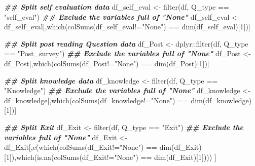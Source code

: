 \documentclass[
]{article}
\newenvironment{Shaded}{\begin{snugshade}}{\end{snugshade}}
\newcommand{\DecValTok}[1]{\textcolor[rgb]{0.00,0.00,0.81}{#1}}
\newcommand{\DocumentationTok}[1]{\textcolor[rgb]{0.56,0.35,0.01}{\textbf{\textit{#1}}}}
\newcommand{\FunctionTok}[1]{\textcolor[rgb]{0.00,0.00,0.00}{#1}}
\newcommand{\NormalTok}[1]{#1}
\newcommand{\OtherTok}[1]{\textcolor[rgb]{0.56,0.35,0.01}{#1}}
\newcommand{\SpecialCharTok}[1]{\textcolor[rgb]{0.00,0.00,0.00}{#1}}
\newcommand{\StringTok}[1]{\textcolor[rgb]{0.31,0.60,0.02}{#1}}
\begin{document}
\begin{Shaded}
\begin{Highlighting}[]
\DocumentationTok{\#\# Split self evaluation data}
\NormalTok{df\_self\_eval }\OtherTok{\textless{}{-}} \FunctionTok{filter}\NormalTok{(df, Q\_type }\SpecialCharTok{==} \StringTok{"self\_eval"}\NormalTok{)}
\DocumentationTok{\#\# Exclude the variables full of "None"}
\NormalTok{df\_self\_eval }\OtherTok{\textless{}{-}}\NormalTok{ df\_self\_eval[,}\FunctionTok{which}\NormalTok{(}\FunctionTok{colSums}\NormalTok{(df\_self\_eval}\SpecialCharTok{!=}\StringTok{"None"}\NormalTok{) }\SpecialCharTok{==} \FunctionTok{dim}\NormalTok{(df\_self\_eval)[}\DecValTok{1}\NormalTok{])]}

\DocumentationTok{\#\# Split post reading Question data}
\NormalTok{df\_Post }\OtherTok{\textless{}{-}}\NormalTok{ dplyr}\SpecialCharTok{::}\FunctionTok{filter}\NormalTok{(df, Q\_type }\SpecialCharTok{==} \StringTok{"Post\_survey"}\NormalTok{)}
\DocumentationTok{\#\# Exclude the variables full of "None"}
\NormalTok{df\_Post }\OtherTok{\textless{}{-}}\NormalTok{ df\_Post[,}\FunctionTok{which}\NormalTok{(}\FunctionTok{colSums}\NormalTok{(df\_Post}\SpecialCharTok{!=}\StringTok{"None"}\NormalTok{) }\SpecialCharTok{==} \FunctionTok{dim}\NormalTok{(df\_Post)[}\DecValTok{1}\NormalTok{])]}

\DocumentationTok{\#\# Split knowledge data}
\NormalTok{df\_knowledge }\OtherTok{\textless{}{-}} \FunctionTok{filter}\NormalTok{(df, Q\_type }\SpecialCharTok{==} \StringTok{"Knowledge"}\NormalTok{)}
\DocumentationTok{\#\# Exclude the variables full of "None"}
\NormalTok{df\_knowledge }\OtherTok{\textless{}{-}}\NormalTok{ df\_knowledge[,}\FunctionTok{which}\NormalTok{(}\FunctionTok{colSums}\NormalTok{(df\_knowledge}\SpecialCharTok{!=}\StringTok{"None"}\NormalTok{) }\SpecialCharTok{==} \FunctionTok{dim}\NormalTok{(df\_knowledge)[}\DecValTok{1}\NormalTok{])]}

\DocumentationTok{\#\# Split Exit}
\NormalTok{df\_Exit }\OtherTok{\textless{}{-}} \FunctionTok{filter}\NormalTok{(df, Q\_type }\SpecialCharTok{==} \StringTok{"Exit"}\NormalTok{)}
\DocumentationTok{\#\# Exclude the variables full of "None"}
\NormalTok{df\_Exit }\OtherTok{\textless{}{-}}\NormalTok{ df\_Exit[,}\FunctionTok{c}\NormalTok{(}\FunctionTok{which}\NormalTok{(}\FunctionTok{colSums}\NormalTok{(df\_Exit}\SpecialCharTok{!=}\StringTok{"None"}\NormalTok{) }\SpecialCharTok{==} \FunctionTok{dim}\NormalTok{(df\_Exit)[}\DecValTok{1}\NormalTok{]),}\FunctionTok{which}\NormalTok{(}\FunctionTok{is.na}\NormalTok{(}\FunctionTok{colSums}\NormalTok{(df\_Exit}\SpecialCharTok{!=}\StringTok{"None"}\NormalTok{) }\SpecialCharTok{==} \FunctionTok{dim}\NormalTok{(df\_Exit)[}\DecValTok{1}\NormalTok{]))) ]}
\end{Highlighting}
\end{Shaded}
\end{document}
